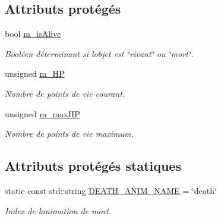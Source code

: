 \subsection*{Attributs protégés}
\begin{DoxyCompactItemize}
\item 
\mbox{\label{classmy_1_1AliveObject_afbeb3d5cebdf6133f3dcace7eea2dff6}} 
bool \hyperlink{classmy_1_1AliveObject_afbeb3d5cebdf6133f3dcace7eea2dff6}{m\+\_\+is\+Alive}
\begin{DoxyCompactList}\small\item\em Booléen déterminant si l\textquotesingle{}objet est \char`\"{}vivant\char`\"{} ou \char`\"{}mort\char`\"{}. \end{DoxyCompactList}\item 
\mbox{\label{classmy_1_1AliveObject_a3659debec3ec999e88aa7bdd7ff09fd5}} 
unsigned \hyperlink{classmy_1_1AliveObject_a3659debec3ec999e88aa7bdd7ff09fd5}{m\+\_\+\+HP}
\begin{DoxyCompactList}\small\item\em Nombre de points de vie courant. \end{DoxyCompactList}\item 
\mbox{\label{classmy_1_1AliveObject_a7c7f74ed8358b08e580462b0d458dd35}} 
unsigned \hyperlink{classmy_1_1AliveObject_a7c7f74ed8358b08e580462b0d458dd35}{m\+\_\+max\+HP}
\begin{DoxyCompactList}\small\item\em Nombre de points de vie maximum. \end{DoxyCompactList}\end{DoxyCompactItemize}
\subsection*{Attributs protégés statiques}
\begin{DoxyCompactItemize}
\item 
\mbox{\label{classmy_1_1AliveObject_aa6ebb3bdd0c42782c37f6a42f4744381}} 
static const std\+::string \hyperlink{classmy_1_1AliveObject_aa6ebb3bdd0c42782c37f6a42f4744381}{D\+E\+A\+T\+H\+\_\+\+A\+N\+I\+M\+\_\+\+N\+A\+ME} = \char`\"{}death\char`\"{}
\begin{DoxyCompactList}\small\item\em Index de l\textquotesingle{}animation de mort. \end{DoxyCompactList}\end{DoxyCompactItemize}


